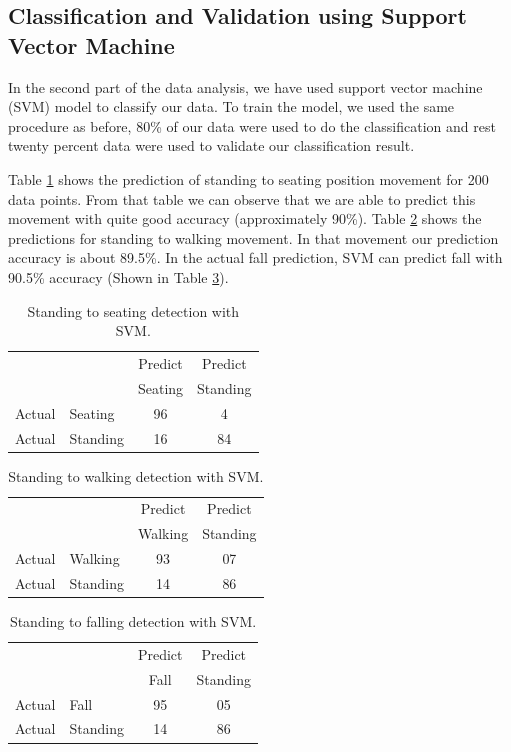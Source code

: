 \documentclass{llncs}
\begin{document}
\begin{sloppy}
\subsection*{Classification and Validation using Support Vector Machine}

In the second part of the data analysis, we have used support vector machine (SVM) model
to classify our data. To train the model, we used the same procedure as before, 80\% of
our data were used to do the classification and rest twenty percent data were used to validate our
classification result.

Table \ref{tab:StandingToSeatingDetectionsvm} shows the prediction of standing to seating position
movement for 200 data points. From that table we can observe that we are able to predict this
movement with quite good accuracy (approximately 90\%). Table
\ref{tab:StandingToWalkingDetectionsvm} shows the predictions for standing to
walking movement. In that movement our prediction accuracy is about 89.5\%. In the actual fall
prediction, SVM can predict fall with 90.5\% accuracy (Shown in Table
\ref{tab:StandingToFallingDetectionsvm}).
\vspace{-5mm}
\begin{table}[!h]
\caption{Standing to seating detection with SVM.}
	\label{tab:StandingToSeatingDetectionsvm}
	\centering
		\begin{tabular} {l l |c |c}
			& & Predict& Predict \\ 
			& & Seating & Standing \\ \hline
			Actual& Seating & 96 & 4\\ \hline
			Actual& Standing & 16& 84\\ \hline
		\end{tabular}
\end{table}
\vspace{-10mm}
\begin{table}[!h]
	\caption{Standing to walking detection with SVM.}
	\label{tab:StandingToWalkingDetectionsvm}
	\centering
		\begin{tabular} {l l |c |c}
			& & Predict& Predict \\ 
			& & Walking & Standing \\ \hline
			Actual& Walking & 93 & 07\\ \hline
			Actual& Standing & 14& 86\\ \hline
		\end{tabular}
\end{table}
\vspace{-10mm}
\begin{table}[!h]
	\caption{Standing to falling detection with SVM.}
	\label{tab:StandingToFallingDetectionsvm}
	\centering
		\begin{tabular} {l l |c |c}
			& & Predict& Predict \\ 
			& & Fall & Standing \\ \hline
			Actual& Fall & 95 & 05\\ \hline
			Actual& Standing & 14& 86\\ \hline
		\end{tabular}
\end{table}
\vspace{-5mm}

\end{sloppy}
\end{document}
